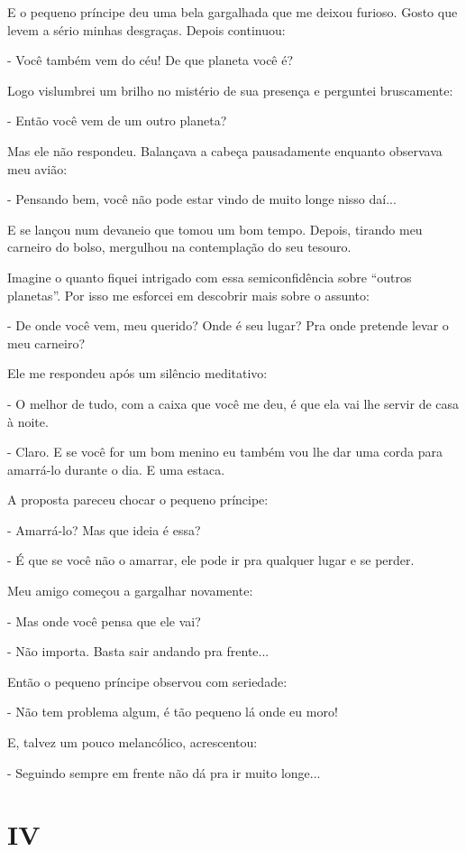 E o pequeno príncipe deu uma bela gargalhada que me deixou furioso.
Gosto que levem a sério minhas desgraças. Depois continuou:

- Você também vem do céu! De que planeta você é?

Logo vislumbrei um brilho no mistério de sua presença e perguntei
bruscamente:

- Então você vem de um outro planeta?

Mas ele não respondeu. Balançava a cabeça pausadamente enquanto
observava meu avião:

- Pensando bem, você não pode estar vindo de muito longe nisso daí...

E se lançou num devaneio que tomou um bom tempo. Depois, tirando meu
carneiro do bolso, mergulhou na contemplação do seu tesouro.

Imagine o quanto fiquei intrigado com essa semiconfidência sobre
``outros planetas''. Por isso me esforcei em descobrir mais sobre o
assunto:

- De onde você vem, meu querido? Onde é seu lugar? Pra onde pretende
levar o meu carneiro?

Ele me respondeu após um silêncio meditativo:

- O melhor de tudo, com a caixa que você me deu, é que ela vai lhe
servir de casa à noite.

- Claro. E se você for um bom menino eu também vou lhe dar uma corda
para amarrá-lo durante o dia. E uma estaca.

A proposta pareceu chocar o pequeno príncipe:

- Amarrá-lo? Mas que ideia é essa?

- É que se você não o amarrar, ele pode ir pra qualquer lugar e se
perder.

Meu amigo começou a gargalhar novamente:

- Mas onde você pensa que ele vai?

- Não importa. Basta sair andando pra frente...

Então o pequeno príncipe observou com seriedade:

- Não tem problema algum, é tão pequeno lá onde eu moro!

E, talvez um pouco melancólico, acrescentou:

- Seguindo sempre em frente não dá pra ir muito longe...

\chapter{IV}

